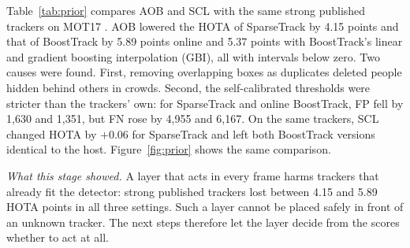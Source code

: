 \documentclass[pdflatex,referee,sn-mathphys-num]{sn-jnl}
\newcommand{\scl}{SCL}
\newcommand{\aob}{AOB}
\begin{document}
Table~\ref{tab:prior} compares \aob{} and \scl{} with the same strong
published trackers on MOT17 \cite{milan2016mot16}. \aob{} lowered the HOTA of
SparseTrack by 4.15 points and that of BoostTrack by 5.89 points online and
5.37 points with BoostTrack's linear and gradient boosting interpolation (GBI), all with
intervals below zero. Two causes
were found. First, removing overlapping boxes as duplicates deleted people
hidden behind others in crowds. Second, the self-calibrated thresholds were
stricter than the trackers' own: for SparseTrack and online BoostTrack, FP
fell by 1,630 and 1,351, but FN rose by 4,955 and 6,167. On the same trackers, \scl{} changed HOTA by $+0.06$ for SparseTrack
and left both BoostTrack versions identical to the host.
Figure~\ref{fig:prior} shows the same comparison.

\emph{What this stage showed.} A layer that acts in every frame harms
trackers that already fit the detector: strong published trackers lost
between 4.15 and 5.89 HOTA points in all three settings. Such a layer cannot
be placed safely in front of an unknown tracker. The next steps therefore let
the layer decide from the scores whether to act at all.
\end{document}
